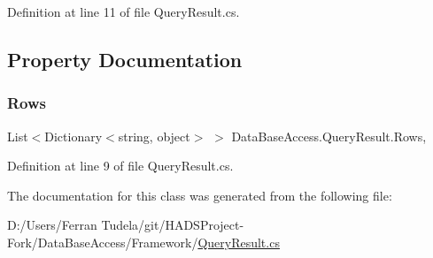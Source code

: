 Definition at line 11 of file Query\+Result.\+cs.



\subsection{Property Documentation}
\mbox{\label{classDataBaseAccess_1_1QueryResult_ad6d699c5577f56da79740f1790433565}} 
\subsubsection{\texorpdfstring{Rows}{Rows}}
{\footnotesize\ttfamily List$<$Dictionary$<$string, object$>$ $>$ Data\+Base\+Access.\+Query\+Result.\+Rows\hspace{0.3cm}{\ttfamily [get]}, {}}



Definition at line 9 of file Query\+Result.\+cs.



The documentation for this class was generated from the following file\+:\begin{DoxyCompactItemize}
\item 
D\+:/\+Users/\+Ferran Tudela/git/\+H\+A\+D\+S\+Project-\/\+Fork/\+Data\+Base\+Access/\+Framework/\mbox{\hyperlink{QueryResult_8cs}{Query\+Result.\+cs}}\end{DoxyCompactItemize}
